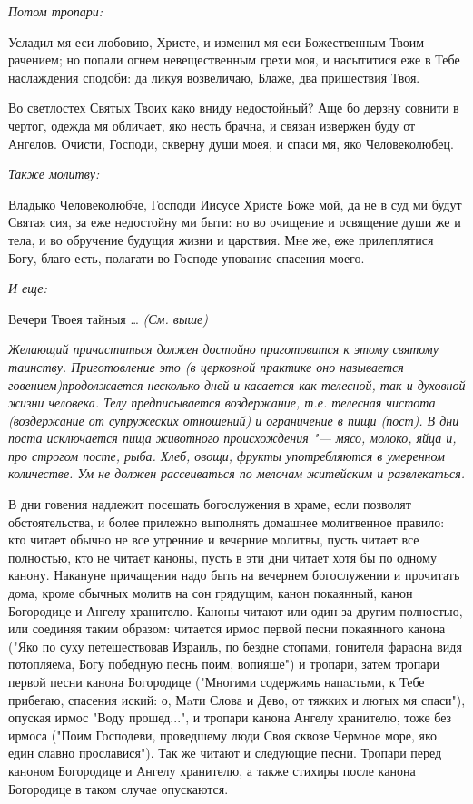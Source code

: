 \medskip
\itshape Потом тропари:\normalfont{}


Усладил мя еси любовию, Христе, и изменил мя еси Божественным Твоим рачением; но попали огнем невещественным грехи моя, и насытитися еже в Тебе наслаждения сподоби: да ликуя возвеличаю, Блаже, два пришествия Твоя.


Во светлостех Святых Твоих како вниду недостойный? Аще бо дерзну совнити в чертог, одежда мя обличает, яко несть брачна, и связан извержен буду от Ангелов. Очисти, Господи, скверну души моея, и спаси мя, яко Человеколюбец.


\medskip
\itshape Также молитву:\normalfont{}


Владыко Человеколюбче, Господи Иисусе Христе Боже мой, да не в суд ми будут Святая сия, за еже недостойну ми быти: но во очищение и освящение души же и тела, и во обручение будущия жизни и царствия. Мне же, еже прилеплятися Богу, благо есть, полагати во Господе упование спасения моего.


\medskip
\itshape И еще:\normalfont{}


Вечери Твоея тайныя … \itshape (См. выше)\normalfont{}


\medskip
\itshape Желающий причаститься должен достойно приготовится к этому святому таинству. Приготовление это (в церковной практике оно называется говением)продолжается несколько дней и касается как телесной, так и духовной жизни человека. Телу предписывается воздержание, т.е. телесная чистота (воздержание от супружеских отношений) и ограничение в пищи (пост). В дни поста исключается пища животного происхождения "--- мясо, молоко, яйца и, про строгом посте, рыба. Хлеб, овощи, фрукты употребляются в умеренном количестве. Ум не должен рассеиваться по мелочам житейским и развлекаться.


В дни говения надлежит посещать богослужения в храме, если позволят обстоятельства, и более прилежно выполнять домашнее молитвенное правило: кто читает обычно не все утренние и вечерние молитвы, пусть читает все полностью, кто не читает каноны, пусть в эти дни читает хотя бы по одному канону. Накануне причащения надо быть на вечернем богослужении и прочитать дома, кроме обычных молитв на сон грядущим, канон покаянный, канон Богородице и Ангелу хранителю. Каноны читают или один за другим полностью, или соединяя таким образом: читается ирмос первой песни покаянного канона ("Яко по суху петешествовав Израиль, по бездне стопами, гонителя фараона видя потопляема, Богу победную песнь поим, вопияше") и тропари, затем тропари первой песни канона Богородице ("Многими содержимь напaстьми, к Тебе прибегаю, спасения иский: о, Мaти Слова и Дево, от тяжких и лютых мя спаси"), опуская ирмос "Воду прошед...", и тропари канона Ангелу хранителю, тоже без ирмоса ("Поим Господеви, проведшему люди Своя сквозе Чермное море, яко един славно прославися"). Так же читают и следующие песни. Тропари перед каноном Богородице и Ангелу хранителю, а также стихиры после канона Богородице в таком случае опускаются.


